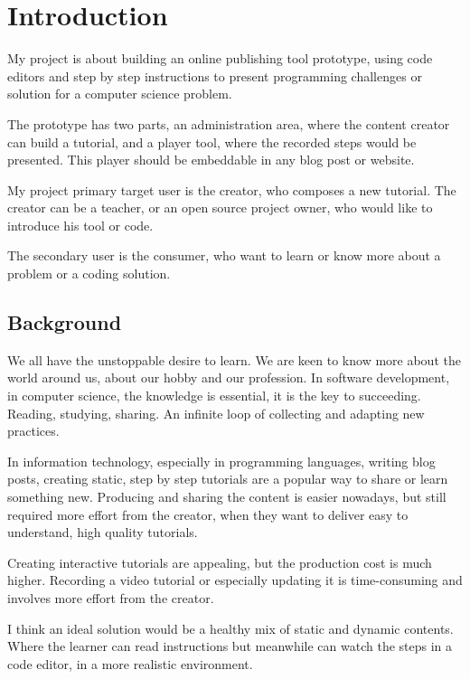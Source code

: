 \chapter{Introduction}\label{C:intro}


My project is about building an online publishing tool prototype, using code editors and step by step instructions to present programming challenges or solution for a computer science problem.

The prototype has two parts, an administration area, where the content creator can build a tutorial, and a player tool, where the recorded steps would be presented. This player should be embeddable in any blog post or website.

My project primary target user is the creator, who composes a new tutorial. The creator can be a teacher, or an open source project owner, who would like to introduce his tool or code.

The secondary user is the consumer, who want to learn or know more about a problem or a coding solution.

\section{Background}

We all have the unstoppable desire to learn. We are keen to know more about the world around us, about our hobby and our profession. In software development, in computer science, the knowledge is essential, it is the key to succeeding. Reading, studying, sharing. An infinite loop of collecting and adapting new practices.

In information technology, especially in programming languages, writing blog posts, creating static, step by step tutorials are a popular way to share or learn something new. Producing and sharing the content is easier nowadays, but still required more effort from the creator, when they want to deliver easy to understand, high quality tutorials.

Creating interactive tutorials are appealing, but the production cost is much higher. Recording a video tutorial or especially updating it is time-consuming and involves more effort from the creator.

I think an ideal solution would be a healthy mix of static and dynamic contents. Where the learner can read instructions but meanwhile can watch the steps in a code editor, in a more realistic environment.
